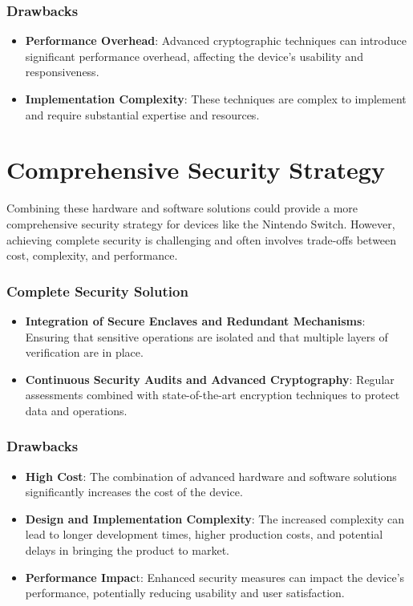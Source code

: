 \subsubsection{Drawbacks}

\begin{itemize}
    \item \textbf{Performance Overhead}: Advanced cryptographic techniques can introduce significant performance overhead, affecting the device's usability and responsiveness.
    \item \textbf{Implementation Complexity}: These techniques are complex to implement and require substantial expertise and resources.
\end{itemize}
\section{Comprehensive Security Strategy}
Combining these hardware and software solutions could provide a more comprehensive security strategy for devices like the Nintendo Switch. However, achieving complete security is challenging and often involves trade-offs between cost, complexity, and performance.

\subsubsection{Complete Security Solution}

\begin{itemize}
    \item \textbf{Integration of Secure Enclaves and Redundant Mechanisms}: Ensuring that sensitive operations are isolated and that multiple layers of verification are in place.
    \item \textbf{Continuous Security Audits and Advanced Cryptography}: Regular assessments combined with state-of-the-art encryption techniques to protect data and operations.
\end{itemize}
\subsubsection{Drawbacks}

\begin{itemize}
    \item \textbf{High Cost}: The combination of advanced hardware and software solutions significantly increases the cost of the device.
    \item \textbf{Design and Implementation Complexity}: The increased complexity can lead to longer development times, higher production costs, and potential delays in bringing the product to market.
    \item \textbf{Performance Impac}t: Enhanced security measures can impact the device's performance, potentially reducing usability and user satisfaction.
\end{itemize}

